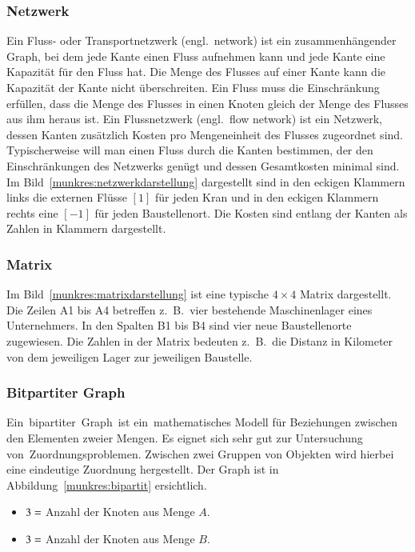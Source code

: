 \subsubsection{Netzwerk}
Ein Fluss- oder Transportnetzwerk (engl.~network) ist ein zusammenhängender Graph, bei dem jede Kante einen Fluss aufnehmen kann und jede Kante eine Kapazität für den Fluss hat.
%
%
%
%
%
Die Menge des Flusses auf einer Kante kann die Kapazität der Kante nicht überschreiten.
Ein Fluss muss die Einschränkung erfüllen, dass die Menge des Flusses
in einen Knoten gleich der Menge des Flusses aus ihm heraus ist.
Ein Flussnetzwerk (engl.~flow network) ist ein Netzwerk, dessen Kanten zusätzlich Kosten pro Mengeneinheit des Flusses zugeordnet sind.
%
Typischerweise will man einen Fluss durch die Kanten bestimmen, der den Einschränkungen des Netzwerks genügt und dessen Gesamtkosten minimal sind.
Im Bild~\ref{munkres:netzwerkdarstellung}
dargestellt sind in den eckigen Klammern links die externen Flüsse $[1]$ für jeden Kran und in den eckigen Klammern rechts eine $[-1]$ für jeden Baustellenort. Die Kosten sind entlang der Kanten als Zahlen in Klammern dargestellt.  
\subsubsection{Matrix}
Im Bild~\ref{munkres:matrixdarstellung}
ist eine typische $4\times 4$ Matrix dargestellt. Die Zeilen A1 bis A4 betreffen z.~B.~vier bestehende Maschinenlager eines Unternehmers. In den Spalten B1 bis B4 sind vier neue Baustellenorte zugewiesen. Die Zahlen in der Matrix bedeuten z.~B.~die Distanz in Kilometer von dem jeweiligen Lager zur jeweiligen Baustelle.
\subsubsection{Bitpartiter Graph}
Ein bipartiter Graph ist ein mathematisches Modell für Beziehungen
zwischen den Elementen zweier Mengen.
%
%
Es eignet sich sehr gut zur Untersuchung von Zuordnungsproblemen.
Zwischen zwei Gruppen von Objekten wird hierbei eine eindeutige Zuordnung hergestellt.
Der Graph ist in Abbildung~\ref{munkres:bipartit}
ersichtlich.
\begin{itemize}
\item $3 =\mathstrut$Anzahl der Knoten aus Menge $A$.
\item $3 =\mathstrut$Anzahl der Knoten aus Menge $B$.
\end{itemize}


